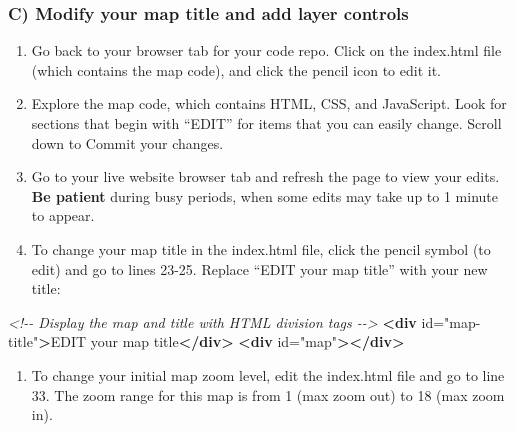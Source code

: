 \documentclass[
  english,
]{book}
\newenvironment{Shaded}{\begin{snugshade}}{\end{snugshade}}
\newcommand{\CommentTok}[1]{\textcolor[rgb]{0.56,0.35,0.01}{\textit{#1}}}
\newcommand{\KeywordTok}[1]{\textcolor[rgb]{0.13,0.29,0.53}{\textbf{#1}}}
\newcommand{\NormalTok}[1]{#1}
\newcommand{\OtherTok}[1]{\textcolor[rgb]{0.56,0.35,0.01}{#1}}
\newcommand{\StringTok}[1]{\textcolor[rgb]{0.31,0.60,0.02}{#1}}
\providecommand{\tightlist}{%
  \setlength{\itemsep}{0pt}\setlength{\parskip}{0pt}}
\begin{document}
\hypertarget{c-modify-your-map-title-and-add-layer-controls}{%
\subsubsection*{C) Modify your map title and add layer controls}\label{c-modify-your-map-title-and-add-layer-controls}}

\begin{enumerate}
\def\labelenumi{\arabic{enumi})}
\setcounter{enumi}{9}
\item
  Go back to your browser tab for your code repo. Click on the index.html file (which contains the map code), and click the pencil icon to edit it.
\item
  Explore the map code, which contains HTML, CSS, and JavaScript. Look for sections that begin with ``EDIT'' for items that you can easily change. Scroll down to Commit your changes.
\item
  Go to your live website browser tab and refresh the page to view your edits. \textbf{Be patient} during busy periods, when some edits may take up to 1 minute to appear.
\item
  To change your map title in the index.html file, click the pencil symbol (to edit) and go to lines 23-25. Replace ``EDIT your map title'' with your new title:
\end{enumerate}

\begin{Shaded}
\begin{Highlighting}[]
\CommentTok{<!{-}{-} Display the map and title with HTML division tags  {-}{-}>}
\KeywordTok{<div}\OtherTok{ id=}\StringTok{"map{-}title"}\KeywordTok{>}\NormalTok{EDIT your map title}\KeywordTok{</div>}
\KeywordTok{<div}\OtherTok{ id=}\StringTok{"map"}\KeywordTok{></div>}
\end{Highlighting}
\end{Shaded}

\begin{enumerate}
\def\labelenumi{\arabic{enumi})}
\setcounter{enumi}{13}
\tightlist
\item
  To change your initial map zoom level, edit the index.html file and go to line 33. The zoom range for this map is from 1 (max zoom out) to 18 (max zoom in).
\end{enumerate}
\end{document}
